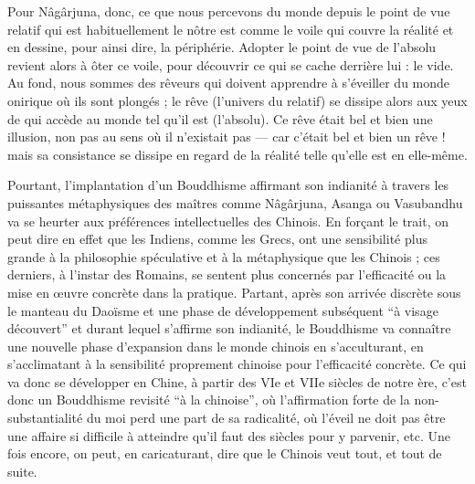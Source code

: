 \documentclass[11pt,a4paper]{article} %
\begin{document}
Pour Nâgârjuna, donc, ce que nous percevons du monde depuis le point de vue relatif
qui est habituellement le nôtre est comme le voile qui couvre la réalité et en dessine,
pour ainsi dire, la périphérie.
Adopter le point de vue de l'absolu revient alors à ôter ce
voile, pour découvrir ce qui se cache derrière lui : le vide.
Au fond, nous sommes des
rêveurs qui doivent apprendre à s'éveiller du monde onirique où ils sont plongés ; le
rêve (l'univers du relatif) se dissipe alors aux yeux de qui accède au monde tel qu'il est
(l'absolu).
Ce rêve était bel et bien une illusion, non pas au sens où il n'existait pas --- car
c'était bel et bien un rêve ! mais sa consistance se dissipe en regard de la réalité telle
qu'elle est en elle-même.

Pourtant, l'implantation d'un Bouddhisme affirmant son indianité à travers les puissantes métaphysiques des maîtres comme Nâgârjuna, Asanga ou Vasubandhu va se heurter
aux préférences intellectuelles des Chinois.
En forçant le trait, on peut dire en effet que
les Indiens, comme les Grecs, ont une sensibilité plus grande à la philosophie spéculative et à la métaphysique que les Chinois ; ces derniers, à l'instar des Romains, se
sentent plus concernés par l'efficacité ou la mise en œuvre concrète dans la pratique.
Partant, après son arrivée discrète sous le manteau du Daoïsme et une phase de développement subséquent ``à visage découvert'' et durant lequel s'affirme son indianité, le
Bouddhisme va connaître une nouvelle phase d'expansion dans le monde chinois en
s'acculturant, en s'acclimatant à la sensibilité proprement chinoise pour l'efficacité
concrète.
Ce qui va donc se développer en Chine, à partir des VIe et VIIe siècles de notre ère, c'est donc un Bouddhisme revisité ``à la chinoise'', où l'affirmation forte de la
non-substantialité du moi perd une part de sa radicalité, où l'éveil ne doit pas être une
affaire si difficile à atteindre qu'il faut des siècles pour y parvenir, etc.
Une fois encore,
on peut, en caricaturant, dire que le Chinois veut tout, et tout de suite.
\end{document}
